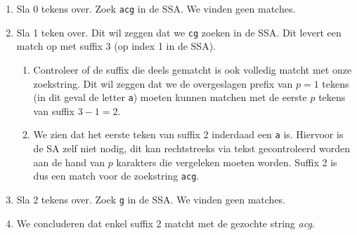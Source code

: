\begin{enumerate}
    \item Sla 0 tekens over.
    Zoek \texttt{acg} in de SSA\@.
    We vinden geen matches.
    \item Sla 1 teken over.
    Dit wil zeggen dat we \texttt{cg} zoeken in de SSA\@.
    Dit levert een match op met suffix 3 (op index 1 in de SSA).
    \begin{enumerate}
        \item Controleer of de suffix die deels gematcht is ook volledig matcht met onze zoekstring.
        Dit wil zeggen dat we de overgeslagen prefix van $p = 1$ tekens (in dit geval de letter \texttt{a}) moeten kunnen matchen met de eerste $p$ tekens van suffix $3 - 1 = 2$.
        \item We zien dat het eerste teken van suffix 2 inderdaad een \texttt{a} is.
        Hiervoor is de SA zelf niet nodig, dit kan rechtstreeks via tekst gecontroleerd worden aan de hand van $p$ karakters die vergeleken moeten worden.
        Suffix 2 is dus een match voor de zoekstring \texttt{acg}.
    \end{enumerate}
    \item Sla 2 tekens over.
    Zoek \texttt{g} in de SSA\@.
    We vinden geen matches.
    \item We concluderen dat enkel suffix 2 matcht met de gezochte string \textit{acg}.
\end{enumerate}

